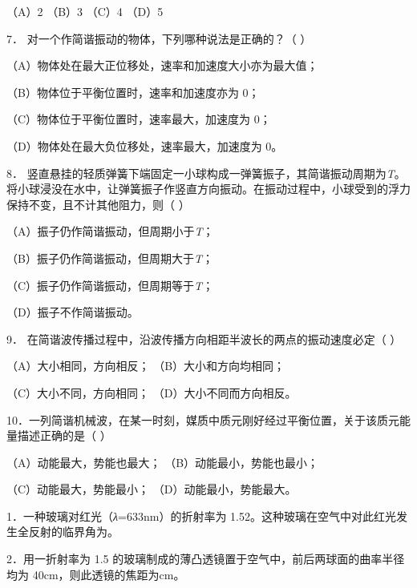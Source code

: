 \documentclass[fontset=exam]{exam-zh}
\begin{document}
（A）2 （B）3 （C）4 （D）5

7． 对一个作简谐振动的物体，下列哪种说法是正确的？（ ）

（A）物体处在最大正位移处，速率和加速度大小亦为最大值；

（B）物体位于平衡位置时，速率和加速度亦为 0；

（C）物体位于平衡位置时，速率最大，加速度为 0；

（D）物体处在最大负位移处，速率最大，加速度为 0。

8． 竖直悬挂的轻质弹簧下端固定一小球构成一弹簧振子，其简谐振动周期为\emph{T}。将小球浸没在水中，让弹簧振子作竖直方向振动。在振动过程中，小球受到的浮力保持不变，且不计其他阻力，则（ ）

（A）振子仍作简谐振动，但周期小于\emph{T}；

（B）振子仍作简谐振动，但周期大于\emph{T}；

（C）振子仍作简谐振动，但周期等于\emph{T}；

（D）振子不作简谐振动。

9． 在简谐波传播过程中，沿波传播方向相距半波长的两点的振动速度必定（ ）

（A）大小相同，方向相反； （B）大小和方向均相同；

（C）大小不同，方向相同； （D）大小不同而方向相反。

10．一列简谐机械波，在某一时刻，媒质中质元刚好经过平衡位置，关于该质元能量描述正确的是（ ）

（A）动能最大，势能也最大； （B）动能最小，势能也最小；

（C）动能最大，势能最小； （D）动能最小，势能最大。


\par{}\smallskip

1．一种玻璃对红光（\emph{λ}=633nm）的折射率为 1.52。这种玻璃在空气中对此红光发生全反射的临界角为\underline{\hspace{1.5cm}}。

2．用一折射率为 1.5 的玻璃制成的薄凸透镜置于空气中，前后两球面的曲率半径均为 40cm，则此透镜的焦距为\underline{\hspace{1.5cm}}cm。
\end{document}
